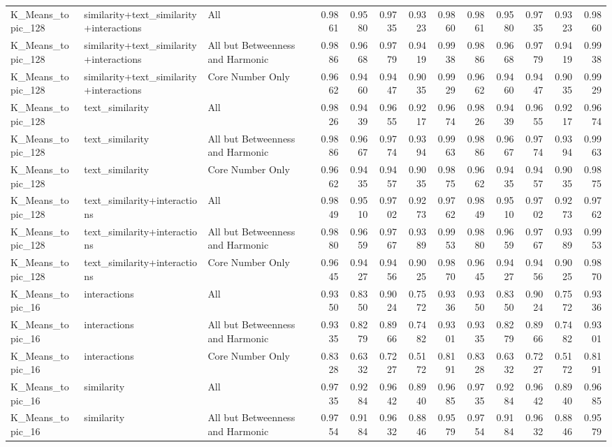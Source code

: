 \begin{tabular}{lllrrrrrrrrrr}
K_Means_topic_128 & similarity+text_similarity+interactions & All & 0.9861 & 0.9580 & 0.9735 & 0.9323 & 0.9860 & 0.9861 & 0.9580 & 0.9735 & 0.9323 & 0.9860 \\
K_Means_topic_128 & similarity+text_similarity+interactions & All but Betweenness and Harmonic & 0.9886 & 0.9668 & 0.9779 & 0.9419 & 0.9938 & 0.9886 & 0.9668 & 0.9779 & 0.9419 & 0.9938 \\
K_Means_topic_128 & similarity+text_similarity+interactions & Core Number Only & 0.9662 & 0.9460 & 0.9447 & 0.9035 & 0.9929 & 0.9662 & 0.9460 & 0.9447 & 0.9035 & 0.9929 \\
K_Means_topic_128 & text_similarity & All & 0.9826 & 0.9439 & 0.9655 & 0.9217 & 0.9674 & 0.9826 & 0.9439 & 0.9655 & 0.9217 & 0.9674 \\
K_Means_topic_128 & text_similarity & All but Betweenness and Harmonic & 0.9886 & 0.9667 & 0.9774 & 0.9394 & 0.9963 & 0.9886 & 0.9667 & 0.9774 & 0.9394 & 0.9963 \\
K_Means_topic_128 & text_similarity & Core Number Only & 0.9662 & 0.9435 & 0.9457 & 0.9035 & 0.9875 & 0.9662 & 0.9435 & 0.9457 & 0.9035 & 0.9875 \\
K_Means_topic_128 & text_similarity+interactions & All & 0.9849 & 0.9510 & 0.9702 & 0.9273 & 0.9762 & 0.9849 & 0.9510 & 0.9702 & 0.9273 & 0.9762 \\
K_Means_topic_128 & text_similarity+interactions & All but Betweenness and Harmonic & 0.9880 & 0.9659 & 0.9767 & 0.9389 & 0.9953 & 0.9880 & 0.9659 & 0.9767 & 0.9389 & 0.9953 \\
K_Means_topic_128 & text_similarity+interactions & Core Number Only & 0.9645 & 0.9427 & 0.9456 & 0.9025 & 0.9870 & 0.9645 & 0.9427 & 0.9456 & 0.9025 & 0.9870 \\
K_Means_topic_16 & interactions & All & 0.9350 & 0.8350 & 0.9024 & 0.7572 & 0.9336 & 0.9350 & 0.8350 & 0.9024 & 0.7572 & 0.9336 \\
K_Means_topic_16 & interactions & All but Betweenness and Harmonic & 0.9335 & 0.8279 & 0.8966 & 0.7482 & 0.9301 & 0.9335 & 0.8279 & 0.8966 & 0.7482 & 0.9301 \\
K_Means_topic_16 & interactions & Core Number Only & 0.8328 & 0.6332 & 0.7227 & 0.5172 & 0.8191 & 0.8328 & 0.6332 & 0.7227 & 0.5172 & 0.8191 \\
K_Means_topic_16 & similarity & All & 0.9735 & 0.9284 & 0.9642 & 0.8940 & 0.9685 & 0.9735 & 0.9284 & 0.9642 & 0.8940 & 0.9685 \\
K_Means_topic_16 & similarity & All but Betweenness and Harmonic & 0.9754 & 0.9184 & 0.9632 & 0.8846 & 0.9579 & 0.9754 & 0.9184 & 0.9632 & 0.8846 & 0.9579 \\

\end{tabular}

